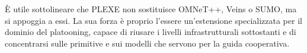 È utile sottolineare che PLEXE non sostituisce OMNeT++, Veins o SUMO, ma si appoggia a essi. La sua forza è proprio l’essere un’estensione specializzata per il dominio del platooning, capace di riusare i livelli infrastrutturali sottostanti e di concentrarsi sulle primitive e sui modelli che servono per la guida cooperativa.
